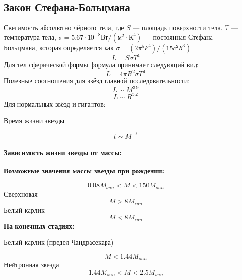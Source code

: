 \subsection{Закон Стефана-Больцмана}
Светимость абсолютно чёрного тела, где $S$ --- площадь поверхности тела, $T$ --- температура тела, $\sigma=5.67\cdot 10^{-8} \text{Вт}/(\text{м}^2\cdot \text{К}^4)$ --- постоянная Стефана-Больцмана, которая определяется как $\sigma=(2\pi^5k^4)/(15c^2h^3)$
\begin{equation}
L=S\sigma T^4
\end{equation}
Для тел сферической формы формула принимает следующий вид:
\begin{equation}
L=4\pi R^2\sigma T^4
\end{equation}
Полезные соотношения для звёзд главной последовательности:
\begin{equation}
L\sim M^{3.9}
\end{equation}
\begin{equation}
L\sim R^{5.2}
\end{equation}
Для нормальных звёзд и гигантов:
\begin{flushleft}
Время жизни звезды
\end{flushleft}
\begin{equation}
t\sim M^{-3}
\end{equation}
\paragraph{Зависимость жизни звезды от массы:}
\begin{flushleft}
\textbf{Возможные значения массы звезды при рождении:}
\end{flushleft}
\begin{equation}
0.08M_{sun}<M<150M_{sun}
\end{equation}
Сверхновая
\begin{equation}
M>8M_{sun}
\end{equation}
Белый карлик
\begin{equation}
M<8M_{sun}
\end{equation}
\textbf{На конечных стадиях:}
\begin{flushleft}
Белый карлик (предел Чандрасекара)
\end{flushleft}
\begin{equation}
M<1.44M_{sun}
\end{equation}
Нейтронная звезда
\begin{equation}
1.44M_{sun}<M<2.5M_{sun}
\end{equation}
